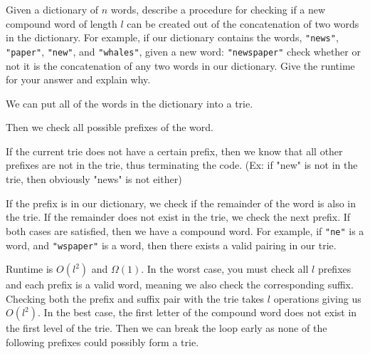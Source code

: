 \begin{blocksection}
\question Given a dictionary of $n$ words, describe a procedure for checking if a
new compound word of length $l$ can be created out of the concatenation of two words in the
dictionary. For example, if our dictionary contains the words,
\lstinline$"news"$, \lstinline$"paper"$, \lstinline$"new"$, and
\lstinline$"whales"$, given a new word:
\lstinline$"newspaper"$ check whether or not it is the concatenation of any two words in our dictionary. Give the runtime for your answer and explain why.

\begin{solution}[1in]
We can put all of the words in the dictionary into a trie. 

Then we check all possible prefixes of the word. 

If the current trie does not have a certain prefix, then we know that all other prefixes are not in the trie, thus terminating the code. (Ex: if "new" is not in the trie, then obviously "news" is not either)

If the prefix is in our dictionary, we check if the remainder of the word is also in the trie. If the remainder does not exist in the trie, we check the next prefix. If both cases are satisfied, then we have a compound word. For example, if \lstinline$"ne"$ is a word, and \lstinline$"wspaper"$ is a word, then there exists a valid pairing in our trie.

Runtime is $O(l^2)$ and $\Omega(1)$. In the worst case, you must check all $l$ prefixes and each prefix is a valid word, meaning we also check the corresponding suffix. Checking both the prefix and suffix pair with the trie takes $l$ operations giving us $O(l^2)$. In the best case, the first letter of the compound word does not exist in the first level of the trie. Then we can break the loop early as none of the following prefixes could possibly form a trie.




\end{solution}
\end{blocksection}
